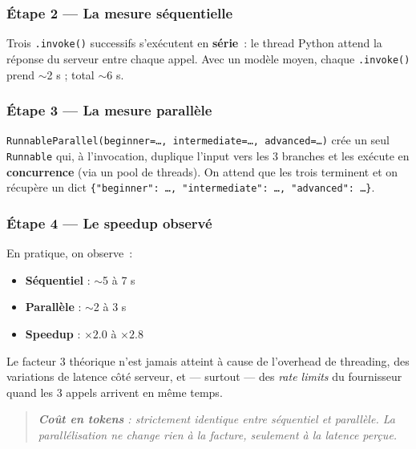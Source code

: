 \documentclass[11pt,a4paper]{article}
\begin{document}
\subsubsection*{Étape 2 — La mesure séquentielle}

Trois \texttt{.invoke()} successifs s'exécutent en \textbf{série}~: le
thread Python attend la réponse du serveur entre chaque appel. Avec un
modèle moyen, chaque \texttt{.invoke()} prend $\sim$2 s ; total $\sim$6 s.

\subsubsection*{Étape 3 — La mesure parallèle}

\texttt{RunnableParallel(beginner=\dots, intermediate=\dots, advanced=\dots)}
crée un seul \texttt{Runnable} qui, à l'invocation, duplique l'input vers
les 3 branches et les exécute en \textbf{concurrence} (via un pool de
threads). On attend que les trois terminent et on récupère un dict
\texttt{\{"beginner": \dots, "intermediate": \dots, "advanced": \dots\}}.

\subsubsection*{Étape 4 — Le speedup observé}

En pratique, on observe~:
\begin{itemize}[leftmargin=*]
  \item \textbf{Séquentiel} : $\sim$5 à 7 s
  \item \textbf{Parallèle}  : $\sim$2 à 3 s
  \item \textbf{Speedup}    : $\times 2.0$ à $\times 2.8$
\end{itemize}

Le facteur 3 théorique n'est jamais atteint à cause de l'overhead de
threading, des variations de latence côté serveur, et — surtout — des
\emph{rate limits} du fournisseur quand les 3 appels arrivent en même
temps.

\begin{quote}\itshape
\textbf{Coût en tokens} : strictement identique entre séquentiel et
parallèle. La parallélisation ne change rien à la facture, seulement à
la latence perçue.
\end{quote}
\end{document}
